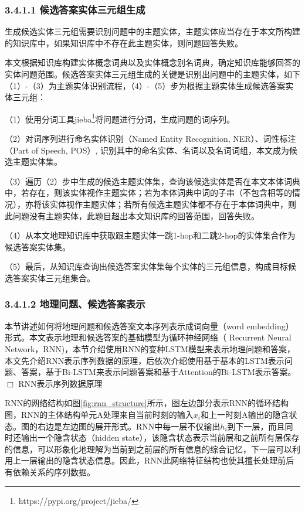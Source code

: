 \subsubsection{3.4.1.1 候选答案实体三元组生成}
生成候选实体三元组需要识别问题中的主题实体，主题实体应当存在于本文所构建的知识库中，如果知识库中不存在此主题实体，则问题回答失败。

本文根据知识库构建实体概念词典以及实体概念别名词典，确定知识库能够回答的实体问题范围。候选答案实体三元组生成的关键是识别出问题中的主题实体，如下（1）-（3）为主题实体识别流程，（4）-（5）步为根据主题实体生成候选答案实体三元组：

（1）使用分词工具jieba\footnote{https://pypi.org/project/jieba/}将问题进行分词，生成问题的词序列。

（2）对词序列进行命名实体识别（Named Entity Recognition, NER）、词性标注（Part  of  Speech, POS）, 识别其中的命名实体、名词以及名词词组，本文成为候选主题实体集。

（3）遍历（2）步中生成的候选主题实体集，查询该候选实体是否在本文本体词典中，若存在，则该实体视作主题实体；若为本体词典中词的子串（不包含相等的情况），亦将该实体视作主题实体；若所有候选主题实体都不存在于本体词典中，则此问题没有主题实体，此题目超出本文知识库的回答范围，回答失败。

（4）从本文地理知识库中获取跟主题实体一跳1-hop和二跳2-hop的实体集合作为候选答案实体集。

（5）最后，从知识库查询出候选答案实体集每个实体的三元组信息，构成目标候选答案实体三元组集合。


\subsubsection{3.4.1.2 地理问题、候选答案表示}
本节讲述如何将地理问题和候选答案文本序列表示成词向量（word embedding）形式。本文表示地理和候选答案的基础模型为循环神经网络（ Recurrent Neural Network，RNN)，本节介绍使用RNN的变种LSTM模型来表示地理问题和答案，本文先介绍RNN表示序列数据的原理，后依次介绍使用基于基本的LSTM表示问题、答案，基于Bi-LSTM来表示问题答案和基于Attention的Bi-LSTM表示答案。
\\

$\Box$ RNN表示序列数据原理

RNN的网络结构如图\ref{fig:rnn_structure}所示，图左边部分表示RNN的循环结构图，RNN的主体结构单元A处理来自当前时刻的输入$x_{i}$和上一时刻A输出的隐含状态。图的右边是左边图的展开形式。RNN中每一层不仅输出$h_{i}$到下一层，而且同时还输出一个隐含状态（hidden state），该隐含状态表示当前层和之前所有层保存的信息，可以形象化地理解为当前到之前层的所有信息的综合记忆，下一层可以利用上一层输出的隐含状态信息。因此，RNN此网络特征结构也使其擅长处理前后有依赖关系的序列数据。

